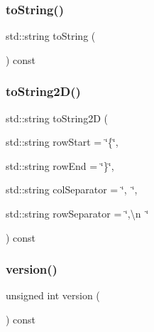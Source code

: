 \mbox{\label{classGrid_a1fe5121d6528fdea3f243321b3fa3a49}} 
\subsubsection{\texorpdfstring{to\+String()}{toString()}}
{\footnotesize\ttfamily std\+::string to\+String (\begin{DoxyParamCaption}{ }\end{DoxyParamCaption}) const}

\mbox{\label{classGrid_a8e636ad8b56218c7e0162d6c1bd78b39}} 
\subsubsection{\texorpdfstring{to\+String2\+D()}{toString2D()}}
{\footnotesize\ttfamily std\+::string to\+String2D (\begin{DoxyParamCaption}\item[{std\+::string}]{row\+Start = {\ttfamily \char`\"{}\{\char`\"{}},  }\item[{std\+::string}]{row\+End = {\ttfamily \char`\"{}\}\char`\"{}},  }\item[{std\+::string}]{col\+Separator = {\ttfamily \char`\"{},~\char`\"{}},  }\item[{std\+::string}]{row\+Separator = {\ttfamily \char`\"{},\textbackslash{}n~\char`\"{}} }\end{DoxyParamCaption}) const}

\mbox{\label{classGrid_a0aa696ccb72cbf928535d6b646bac1aa}} 
\subsubsection{\texorpdfstring{version()}{version()}}
{\footnotesize\ttfamily unsigned int version (\begin{DoxyParamCaption}{ }\end{DoxyParamCaption}) const}

\mbox{\label{classGrid_ad72663daf610f2a0833a2fc3d78e4fdf}} 
